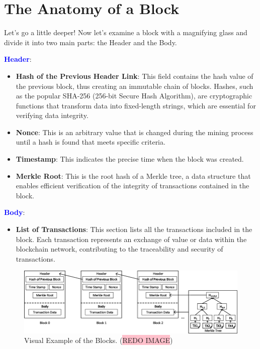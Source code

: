 \section{The Anatomy of a Block}

Let's go a little deeper! Now let's examine a block with a magnifying glass and divide it into two main parts: the Header and the Body.

\textbf{\textcolor{Blue}{Header}}:
\begin{itemize}
    \item \textbf{Hash of the Previous Header Link}: This field contains the hash value of the previous block, thus creating an immutable chain of blocks. Hashes, such as the popular SHA-256 (256-bit Secure Hash Algorithm), are cryptographic functions that transform data into fixed-length strings, which are essential for verifying data integrity.
    \item \textbf{Nonce}: This is an arbitrary value that is changed during the mining process until a hash is found that meets specific criteria.
    \item \textbf{Timestamp}: This indicates the precise time when the block was created.
    \item \textbf{Merkle Root}: This is the root hash of a Merkle tree, a data structure that enables efficient verification of the integrity of transactions contained in the block.
\end{itemize}


\textbf{\textcolor{Blue}{Body}}:
\begin{itemize}
    \item \textbf{List of Transactions}: This section lists all the transactions included in the block. Each transaction represents an exchange of value or data within the blockchain network, contributing to the traceability and security of transactions.
\end{itemize}

\vspace{1cm}
\begin{figure}[hb]
\centering\includegraphics[scale=0.44]{images/chapter2 - Blocks.png}
\caption{Visual Example of the Blocks. (\color{red}\colorbox{pink}{REDO IMAGE})}
\end{figure}
